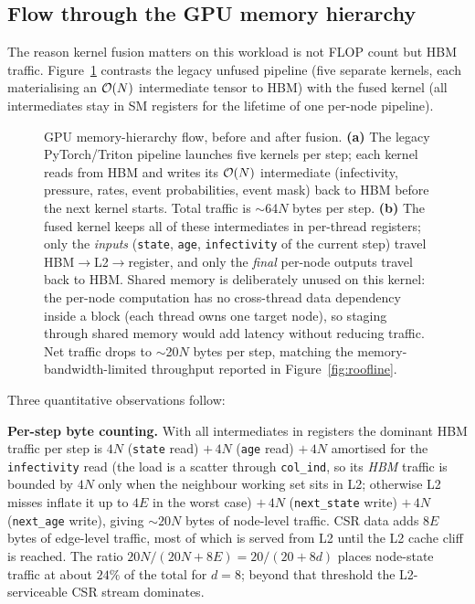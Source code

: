 \subsection{Flow through the GPU memory hierarchy}
\label{app:memory_flow}

The reason kernel fusion matters on this workload is not FLOP count but HBM traffic. Figure~\ref{fig:memory_flow} contrasts the legacy unfused pipeline (five separate kernels, each materialising an $\mathcal{O}(N)$ intermediate tensor to HBM) with the fused kernel (all intermediates stay in SM registers for the lifetime of one per-node pipeline).

\begin{figure}[H]
\centering

\caption{GPU memory-hierarchy flow, before and after fusion. \textbf{(a)} The legacy PyTorch/Triton pipeline launches five kernels per step; each kernel reads from HBM and writes its $\mathcal{O}(N)$ intermediate (infectivity, pressure, rates, event probabilities, event mask) back to HBM before the next kernel starts. Total traffic is $\sim$64$N$ bytes per step. \textbf{(b)} The fused kernel keeps all of these intermediates in per-thread registers; only the \emph{inputs} (\texttt{state}, \texttt{age}, \texttt{infectivity} of the current step) travel HBM$\to$L2$\to$register, and only the \emph{final} per-node outputs travel back to HBM. Shared memory is deliberately unused on this kernel: the per-node computation has no cross-thread data dependency inside a block (each thread owns one target node), so staging through shared memory would add latency without reducing traffic. Net traffic drops to $\sim$20$N$ bytes per step, matching the memory-bandwidth-limited throughput reported in Figure~\ref{fig:roofline}.}
\label{fig:memory_flow}
\end{figure}

Three quantitative observations follow:

\textbf{Per-step byte counting.} With all intermediates in registers the dominant HBM traffic per step is $4N$ (\texttt{state} read) $+\,4N$ (\texttt{age} read) $+\,4N$ amortised for the \texttt{infectivity} read (the load is a scatter through \texttt{col\_ind}, so its \emph{HBM} traffic is bounded by $4N$ only when the neighbour working set sits in L2; otherwise L2 misses inflate it up to $4E$ in the worst case) $+\,4N$ (\texttt{next\_state} write) $+\,4N$ (\texttt{next\_age} write), giving $\sim$$20N$ bytes of node-level traffic. CSR data adds $8E$ bytes of edge-level traffic, most of which is served from L2 until the L2 cache cliff is reached. The ratio $20N / (20N + 8E) = 20 / (20 + 8d)$ places node-state traffic at about $24\%$ of the total for $d = 8$; beyond that threshold the L2-serviceable CSR stream dominates.

